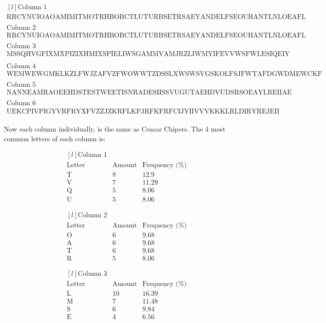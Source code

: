 \documentclass{article}
\begin{document}
	\[
	\begin{matrix*}[l]
	\text{Column 1}\\
	\text{RRCYNUIOAOAMIMITMOTRHBOBCTLUTURBSETRSAEYANDELFSEOUHANTLNLOEAFL}\\
	\\
	\text{Column 2}\\
	\text{RRCYNUIOAOAMIMITMOTRHBOBCTLUTURBSETRSAEYANDELFSEOUHANTLNLOEAFL}\\
	\\
	\text{Column 3}\\
	\text{MSSQHVGFIXMXPIZIXHMIXSPIELIWSGAMMVAMJRZLIWMYIFEVVWSFWLESIQEIY}\\
	\\
	\text{Column 4}\\
	\text{WEMWEWGMKLKZLFWJZAFVZFWOWWTZDSSLXWSWSVGSKOLFSJFWTAFDGWDMEWCKF}\\
	\\
	\text{Column 5}\\
	\text{NANNEAMRAOEEHDSTESTWEETISNRADESIISSVUGUTAEHDVUDSRSOEAYLREIIAE}\\
	\\
	\text{Column 6}\\
	\text{UEKCPIVPIGYVRFRYXFVZZJZKRFLKPJRFKFRFCIJYIIVVVKKKLRLDIRYREJEII}
	\end{matrix*}
	\]
	\\
	Now each column individually, is the same as Ceasar Chipers. The 4 most common letters of each column is:
	
	\[
	\begin{matrix*}[l]
	\text{Column 1} \\
	\text{Letter} & \text{Amount} & \text{Frequency (\%)} \\
	\text{T} & 8&12.9 \\
	\text{V} & 7&11.29 \\
	\text{Q} & 5&8.06 \\
	\text{U} & 5&8.06
	\end{matrix*}
	\]
	
	\[
	\begin{matrix*}[l]
	\text{Column 2} \\
	\text{Letter} & \text{Amount} & \text{Frequency (\%)} \\
	\text{O} & 6&9.68 \\
	\text{A} & 6&9.68 \\
	\text{T} & 6&9.68 \\
	\text{R} & 5&8.06
	\end{matrix*}
	\]
	
	\[
	\begin{matrix*}[l]
	\text{Column 3} \\
	\text{Letter} & \text{Amount} & \text{Frequency (\%)} \\
	\text{L} & 10&16.39 \\
	\text{M} & 7&11.48 \\
	\text{S} & 6&9.84 \\
	\text{E} & 4&6.56
	\end{matrix*}
	\]
	
\end{document}
